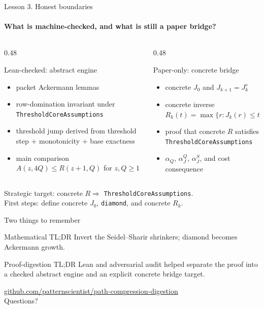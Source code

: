 \documentclass[aspectratio=169,11pt]{beamer}
\begin{document}
\begin{frame}{Lesson 3. Honest boundaries}
\framesubtitle{What is machine-checked, and what is still a paper bridge?}
\begin{columns}[T,totalwidth=\textwidth]
\begin{column}{0.48\textwidth}
\begin{block}{Lean-checked: abstract engine}
\small
\begin{itemize}
  \item packet Ackermann lemmas
  \item row-domination invariant under \texttt{ThresholdCoreAssumptions}
  \item threshold jump derived from threshold step + monotonicity + base exactness
  \item main comparison $A(z,4Q)\le R(z+1,Q)$ for $z,Q\ge 1$
\end{itemize}
\end{block}
\end{column}
\begin{column}{0.48\textwidth}
\begin{block}{Paper-only: concrete bridge}
\small
\begin{itemize}
  \item concrete $J_0$ and $J_{k+1}=J_k^\diamond$
  \item concrete inverse $R_k(t)=\max\{r:J_k(r)\le t\}$
  \item proof that concrete $R$ satisfies \texttt{ThresholdCoreAssumptions}
  \item $\alpha_Q$, $\alpha_J^Q$, $\alpha_J^S$, and cost consequence
\end{itemize}
\end{block}
\end{column}
\end{columns}
\vspace{0.2cm}
\begin{center}
\Large Strategic target: concrete $R\Rightarrow$ \texttt{ThresholdCoreAssumptions}.\\
\normalsize First steps: define concrete $J_0$, \texttt{diamond}, and concrete $R_k$.
\end{center}
\end{frame}

\begin{frame}{Two things to remember}
\begin{block}{Mathematical TL;DR}
\centering
\Large Invert the Seidel--Sharir shrinkers; diamond becomes Ackermann growth.
\end{block}
\vspace{0.35cm}
\begin{block}{Proof-digestion TL;DR}
\centering
\Large Lean and adversarial audit helped separate the proof into a checked abstract engine and an explicit concrete bridge target.
\end{block}
\vfill
\begin{center}
\href{https://github.com/patternscientist/path-compression-digestion}{github.com/patternscientist/path-compression-digestion}\\[0.25cm]
Questions?
\end{center}
\end{frame}
\end{document}
